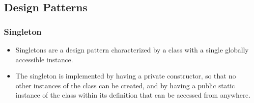 \documentclass{article}
\begin{document}
\subsection{Design Patterns}
\subsubsection{Singleton}
\begin{itemize}
    \item Singletons are a design pattern characterized by a class with a single globally accessible instance.
    \item The singleton is implemented by having a private constructor, so that no other instances of the class can be created, and by having a public static instance of the class within its definition that can be accessed from anywhere.
\end{itemize}
\end{document}
